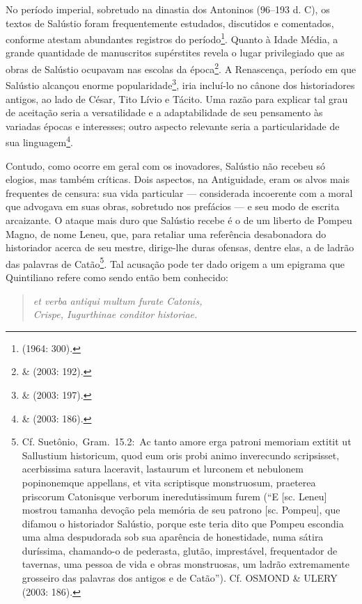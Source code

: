 No período imperial, sobretudo na dinastia dos Antoninos (96--193 d. C), os
textos de Salústio foram frequentemente estudados, discutidos e comentados,
conforme atestam abundantes registros do período\footnote{ (1964: 300).}.
Quanto à Idade Média, a grande quantidade de manuscritos supérstites revela o
lugar privilegiado que as obras de Salústio ocupavam nas escolas da
época\footnote{ \&  (2003: 192).}. A Renascença, período em que
Salústio alcançou enorme popularidade\footnote{ \&  (2003: 197).},
iria incluí-lo no cânone dos historiadores antigos, ao lado de César, Tito
Lívio e Tácito. Uma razão para explicar tal grau de aceitação seria a
versatilidade e a adaptabilidade de seu pensamento às variadas épocas e
interesses; outro aspecto relevante seria a particularidade de sua
linguagem\footnote{ \&  (2003: 186).}. 

Contudo, como ocorre em geral com os inovadores, Salústio não recebeu só
elogios, mas também críticas. Dois aspectos, na Antiguidade, eram os alvos mais
frequentes de censura: sua vida particular --- considerada incoerente com a
moral que advogava em suas obras, sobretudo nos prefácios --- e seu modo de 
escrita arcaizante.  O ataque mais duro que Salústio recebe é o de um liberto
de Pompeu Magno, de nome Leneu, que, para retaliar uma referência desabonadora
do historiador acerca de seu mestre, dirige-lhe duras ofensas, dentre elas, a
de ladrão das palavras de Catão\footnote{Cf. Suetônio, Gram. 15.2: Ac tanto amore erga patroni memoriam extitit ut Sallustium historicum, quod eum oris probi animo inverecundo scripsisset, acerbissima satura laceravit, lastaurum et lurconem et nebulonem popinonemque appellans, et vita scriptisque monstruosum, praeterea priscorum Catonisque verborum ineredutissimum furem
(“E [sc. Leneu] mostrou tamanha devoção pela memória de seu patrono [sc. Pompeu], que difamou o historiador Salústio, porque este teria dito que Pompeu escondia uma alma despudorada sob sua aparência de honestidade, numa sátira duríssima, chamando-o de pederasta, glutão, imprestável, frequentador de tavernas, uma pessoa de vida e obras monstruosas, um ladrão extremamente grosseiro das palavras dos antigos e de Catão”). Cf. OSMOND \& ULERY (2003: 186).}. Tal acusação pode ter dado origem a um epigrama que
Quintiliano refere como sendo então bem conhecido: 

\begin{verse}
\emph{et verba antiqui
multum furate Catonis,\\ Crispe, Iugurthinae conditor historiae.} 

\end{verse}
 


